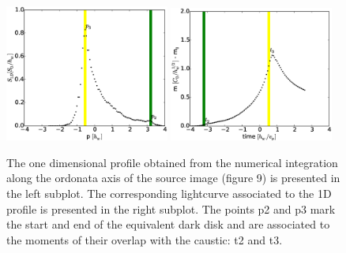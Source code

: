 \begin{figure}
\centering
	\includegraphics[width = 0.48\textwidth]{plots/M87_shape.eps}
        \includegraphics[width = 0.48\textwidth]{plots/M87_lc.eps}
\caption{\label{fig:M87_plots} The one dimensional profile obtained from the numerical integration along the ordonata axis of the source image (figure 9) is presented in the left subplot. The corresponding lightcurve associated to the 1D profile is presented in the right subplot. The points p2 and p3 mark the start and end of the equivalent dark disk and are associated to the moments of their overlap with the caustic: t2 and t3.}
\end{figure}





